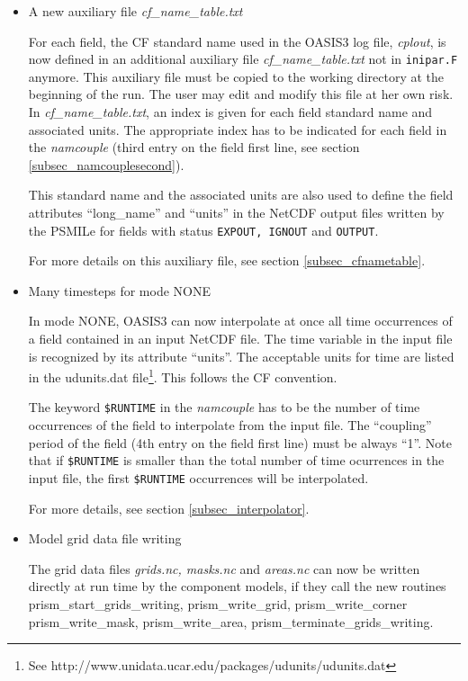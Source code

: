 \begin{itemize}
\item A new auxiliary file {\em cf\_name\_table.txt}

For each field, the CF standard name used in the OASIS3 log file, {\em
cplout}, is now defined in an additional auxiliary file {\em
cf\_name\_table.txt} 
not in {\tt inipar.F} anymore. This auxiliary file must be
copied to the working directory at the beginning of the run. The user
may edit and modify this file at her own risk. In {\em
cf\_name\_table.txt}, an index is given for each field standard name
and associated units.  The appropriate index has to be indicated for
each field in the {\it namcouple} (third entry on the field first
line, see section \ref{subsec_namcouplesecond}). 

This standard name and the associated units are also used to define the
field attributes ``long\_name'' and ``units'' in the NetCDF output files
written by the PSMILe for fields with status {\tt EXPOUT, IGNOUT} and
{\tt OUTPUT}.
 
For more details on this auxiliary file, see section
\ref{subsec_cfnametable}.

\item Many timesteps for mode NONE

In mode NONE, OASIS3 can now interpolate at once all time occurrences
of a field contained in an input NetCDF file. The time variable in the
input file is recognized by its attribute ``units''. The acceptable
units for time are listed in the udunits.dat file\footnote{See http://www.unidata.ucar.edu/packages/udunits/udunits.dat}. This
follows the CF convention.

The keyword {\tt \$RUNTIME} in the {\it namcouple} has to be the number of time
occurrences of the field to interpolate from the input file. The
``coupling'' period of the field (4th entry on the field first line)
must be always ``1''. Note that if {\tt \$RUNTIME} is smaller than the
total number of time ocurrences in the input file, the first {\tt \$RUNTIME} 
occurrences will be interpolated.

For more details, see section \ref{subsec_interpolator}.

\item Model grid data file writing

The grid data files {\em grids.nc, masks.nc} and {\em areas.nc} can
now be written directly at run time by the component models, if they
call the new routines prism\_start\_grids\_writing, prism\_write\_grid,
prism\_write\_corner prism\_write\_mask, prism\_write\_area,
prism\_terminate\_grids\_writing. 


\end{itemize}
